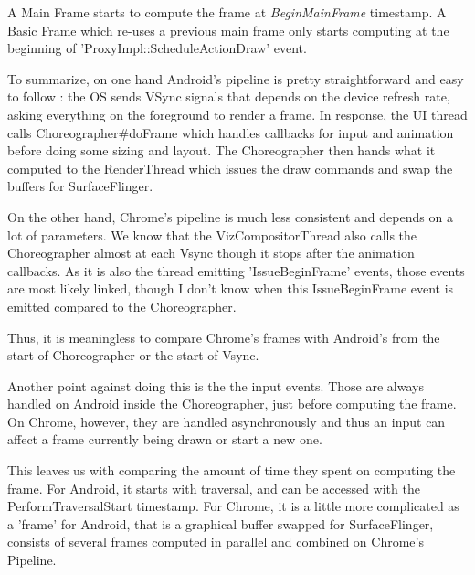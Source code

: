 A Main Frame starts to compute the frame at \textit{BeginMainFrame} timestamp. A Basic Frame which re-uses a previous main frame only starts computing at the beginning of 'ProxyImpl::ScheduleActionDraw' event. 

    To summarize, on one hand Android's pipeline is pretty straightforward and easy to follow : the OS sends VSync signals that depends on the device refresh rate, asking everything on the foreground to render a frame. In response, the UI thread calls Choreographer\#doFrame which handles callbacks for input and animation before doing some sizing and layout. The Choreographer then hands what it computed to the RenderThread which issues the draw commands and swap the buffers for SurfaceFlinger.


On the other hand, Chrome's pipeline is much less consistent and depends on a lot of parameters. We know that the VizCompositorThread also calls the Choreographer almost at each Vsync though it stops after the animation callbacks. As it is also the thread emitting 'IssueBeginFrame' events, those events are most likely linked, though I don't know when this IssueBeginFrame event is emitted compared to the Choreographer.

Thus, it is meaningless to compare Chrome's frames with Android's from the start of Choreographer or the start of Vsync.

Another point against doing this is the the input events. Those are always handled on Android inside the Choreographer, just before computing the frame. On Chrome, however, they are handled asynchronously and thus an input can affect a frame currently being drawn or start a new one.

This leaves us with comparing the amount of time they spent on computing the frame. For Android, it starts with traversal, and can be accessed with the PerformTraversalStart timestamp. For Chrome, it is a little more complicated as a 'frame' for Android, that is a graphical buffer swapped for SurfaceFlinger, consists of several frames computed in parallel and combined on Chrome's Pipeline. \newline

